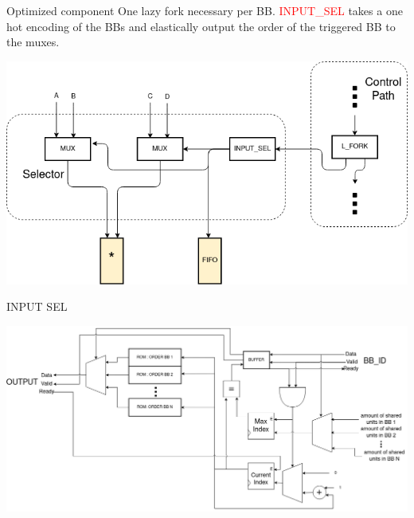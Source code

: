 \documentclass{beamer}
\renewcommand{\emph}{\textcolor{red}}
\begin{document}
\begin{frame}{Optimized component}
One lazy fork necessary per BB. \emph{INPUT\_SEL} takes a one hot encoding of the BBs and elastically output the order of the triggered BB to the muxes. 
\begin{center}
\includegraphics[scale=0.35]{opti_selector.png}
\end{center}
\end{frame}

\begin{frame}{INPUT SEL}
\begin{center}
\includegraphics[scale=0.27]{SEL_INPUT.png}
\end{center}
\end{frame}
\end{document}
